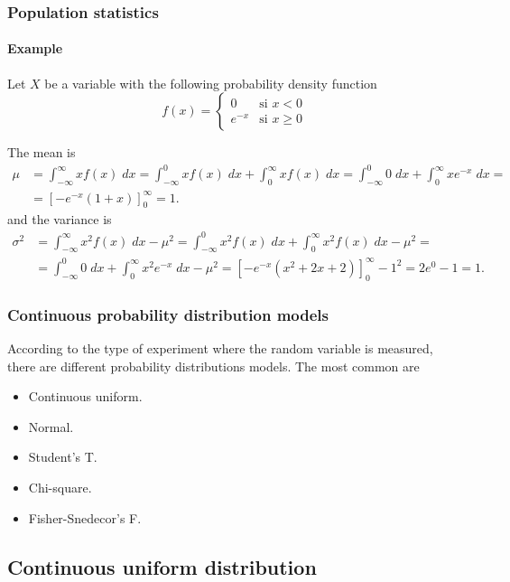 \begin{frame}
\frametitle{Population statistics}
\framesubtitle{Example}
Let $X$ be a variable with the following probability density function
\[
f(x) =
\begin{cases}
0 & \mbox{si $x<0$}\\
e^{-x} & \mbox{si $x\geq 0$}
\end{cases}
\]

The mean is 
\begin{align*}
\mu &= \int_{-\infty}^\infty xf(x)\;dx = \int_{-\infty}^0 xf(x)\;dx +\int_0^\infty xf(x)\;dx = \int_{-\infty}^0 0\;dx +\int_0^\infty xe^{-x}\;dx =\\
&= \left[-e^{-x}(1+x)\right]_0^{\infty} = 1.
\end{align*}
and the variance is
\begin{align*}
\sigma^2 &= \int_{-\infty}^\infty x^2f(x)\;dx -\mu^2 = \int_{-\infty}^0 x^2f(x)\;dx +\int_0^\infty x^2f(x)\;dx -\mu^2 = \\
&= \int_{-\infty}^0 0\;dx +\int_0^\infty x^2e^{-x}\;dx -\mu^2= \left[-e^{-x}(x^2+2x+2)\right]_0^{\infty} - 1^2= 2e^0-1 = 1.
\end{align*}
\end{frame}



\begin{frame}
\frametitle{Continuous probability distribution models}
According to the type of experiment where the random variable is measured, there are different probability distributions
models. 
The most common are
\begin{itemize}
\item Continuous uniform.
\item Normal.
\item Student's T.
\item Chi-square.
\item Fisher-Snedecor's F.
\end{itemize}
\end{frame}


\subsection{Continuous uniform distribution}


